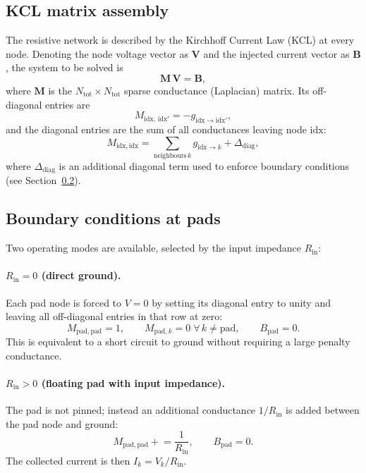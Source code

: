 \documentclass[preprint,numbers,1p]{elsarticle}
\begin{document}
\subsection{KCL matrix assembly}
\label{sec:kcl}

The resistive network is described by the Kirchhoff Current Law (KCL) at every node. Denoting
the node voltage vector as $\mathbf{V}$ and the injected current vector as $\mathbf{B}$, the
system to be solved is
\begin{equation}
  \mathbf{M}\,\mathbf{V} = \mathbf{B},
\end{equation}
where $\mathbf{M}$ is the $N_\mathrm{tot}\times N_\mathrm{tot}$ sparse conductance (Laplacian)
matrix. Its off-diagonal entries are
\begin{equation}
  M_{\mathrm{idx},\,\mathrm{idx}'} = -g_{\mathrm{idx}\to\mathrm{idx}'},
\end{equation}
and the diagonal entries are the sum of all conductances leaving node $\mathrm{idx}$:
\begin{equation}
  M_{\mathrm{idx},\mathrm{idx}} = \sum_{\mathrm{neighbours}\,k} g_{\mathrm{idx}\to k}
  + \Delta_\mathrm{diag},
\end{equation}
where $\Delta_\mathrm{diag}$ is an additional diagonal term used to enforce boundary conditions
(see Section~\ref{sec:bc}).

\subsection{Boundary conditions at pads}
\label{sec:bc}

Two operating modes are available, selected by the input impedance $R_\mathrm{in}$:

\paragraph{$R_\mathrm{in} = 0$ (direct ground).}
Each pad node is forced to $V = 0$ by setting its diagonal entry to unity and leaving all
off-diagonal entries in that row at zero:
\begin{equation}
  M_{\mathrm{pad},\mathrm{pad}} = 1, \qquad
  M_{\mathrm{pad},k} = 0 \; \forall\, k\neq \mathrm{pad}, \qquad
  B_\mathrm{pad} = 0.
\end{equation}
This is equivalent to a short circuit to ground without requiring a large penalty conductance.

\paragraph{$R_\mathrm{in} > 0$ (floating pad with input impedance).}
The pad is not pinned; instead an additional conductance $1/R_\mathrm{in}$ is added between
the pad node and ground:
\begin{equation}
  M_{\mathrm{pad},\mathrm{pad}} \mathrel{+}= \frac{1}{R_\mathrm{in}}, \qquad
  B_\mathrm{pad} = 0.
\end{equation}
The collected current is then $I_k = V_k / R_\mathrm{in}$.
\end{document}
